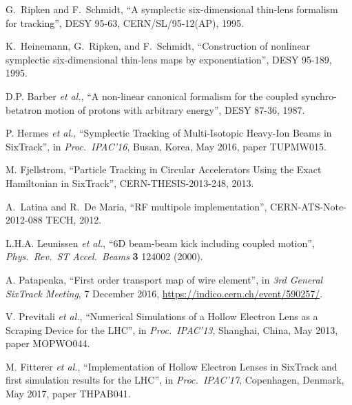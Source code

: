 \documentclass[a4paper,
              ]{jacow}
\begin{document}
\begin{thebibliography}{99}
G.~Ripken and F.~Schmidt,
``A symplectic six-dimensional thin-lens formalism for tracking'',
DESY 95-63, CERN/SL/95-12(AP), 1995.

K.~Heinemann, G.~Ripken, and F.~Schmidt,
``Construction of nonlinear symplectic six-dimensional thin-lens maps by exponentiation'',
DESY 95-189, 1995.

D.P. Barber {\it et al.},
``A non-linear canonical formalism for the coupled synchro-betatron motion of protons with arbitrary energy'',
DESY 87-36, 1987.

 P. Hermes {\it et al.},
``Symplectic Tracking of Multi-Isotopic Heavy-Ion Beams in SixTrack'', in \textit{Proc.~IPAC'16}, Busan, Korea, May 2016, paper TUPMW015.

M. Fjellstrom, ``Particle Tracking in Circular Accelerators Using the Exact Hamiltonian in SixTrack'', CERN-THESIS-2013-248, 2013.

A.~Latina and R.~De Maria, ``RF multipole implementation'', CERN-ATS-Note-2012-088 TECH, 2012.

L.H.A. Leunissen {\it et al.}, ``6D beam-beam kick including coupled motion'', {\it Phys.\ Rev.\ ST Accel.\ Beams} {\bf 3} 124002 (2000).

A. Patapenka,
``First order transport map of wire element'',
in \textit{3rd General SixTrack Meeting}, 7 December 2016, \url{https://indico.cern.ch/event/590257/}.

V. Previtali {\it et al.},
``Numerical Simulations of a Hollow Electron Lens as a Scraping Device for the LHC'',
in \textit{Proc.~IPAC'13}, Shanghai, China, May 2013, paper MOPWO044.


M. Fitterer {\it et al.},
``Implementation of Hollow Electron Lenses in SixTrack and first simulation results for the LHC'',
in \textit{Proc.~IPAC'17}, Copenhagen, Denmark, May 2017, paper THPAB041.




\end{thebibliography}
\end{document}
